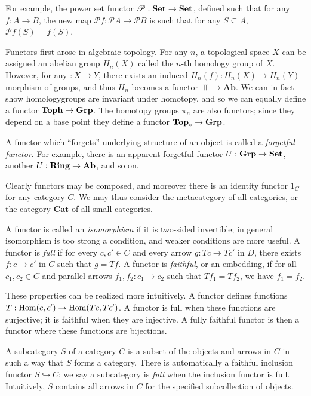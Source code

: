 For example, the power set functor $\mathscr{P} : \mathbf{Set}  \to \mathbf{Set} $, defined such that for any $f : A \to B$, the new map $\mathscr{P} f : \mathscr{P} A \to \mathscr{P} B$ is such that for any $S\subseteq A$, $\mathscr{P} f(S)=f(S)$.

Functors first arose in algebraic topology. For any $n$, a topological space $X$ can be assigned an abelian group $H_n(X)$ called the $n$-th homology group of $X$. However, for any $: X \to Y$, there exists an induced $H_n(f): H_n(X) \to H_n(Y)$ morphism of groups, and thus $H_n$ becomes a functor $\Top \to \mathbf{Ab} $. We can in fact show homologygroups are invariant under homotopy, and so we can equally define a functor $\mathbf{Toph} \to \mathbf{Grp} $. The homotopy groups $\pi _n$ are also functors; since they depend on a base point they define a functor $\mathbf{Top}_* \to \mathbf{Grp} $.

A functor which ``forgets'' underlying structure of an object is called a \emph{forgetful functor}. For example, there is an apparent forgetful functor $U : \mathbf{Grp}  \to \mathbf{Set} $, another $U : \mathbf{Ring}  \to \mathbf{Ab}  $, and so on.

Clearly functors may be composed, and moreover there is an identity functor $1_C$ for any category $C$. We may thus consider the metacategory of all categories, or the category $\mathbf{Cat} $ of all small categories.

A functor is called an \emph{isomorphism} if it is two-sided invertible; in general isomorphism is too strong a condition, and weaker conditions are more useful. A functor is \emph{full} if for every $c,c'\in C$ and every arrow $g : Tc \to Tc'$ in $D$, there exists $f : c \to c'$ in $C$ such that $g=Tf$. A functor is \emph{faithful}, or an embedding, if for all $c_1,c_2\in C$ and parallel arrows $f_1,f_2: c_1 \to c_2$ such that $Tf_1=Tf_2$, we have $f_1=f_2$.

These properties can be realized more intuitively. A functor defines functions $T : \operatorname{Hom}(c, c')  \to \operatorname{Hom}(Tc, Tc') $. A functor is full when these functions are surjective; it is faithful when they are injective. A fully faithful functor is then a functor where these functions are bijections.

A subcategory $S$ of a category $C$ is a subset of the objects and arrows in $C$ in such a way that $S$ forms a category. There is automatically a faithful inclusion functor $S\hookrightarrow C$; we say a subcategory is \emph{full} when the inclusion functor is full. Intuitively, $S$ contains all arrows in $C$ for the specified subcollection of objects.

